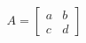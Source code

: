\documentclass[preview]{standalone}
\begin{document}
\begin{align*}
A=\begin{bmatrix}a&b\\c&d\end{bmatrix}
\end{align*}
\end{document}
